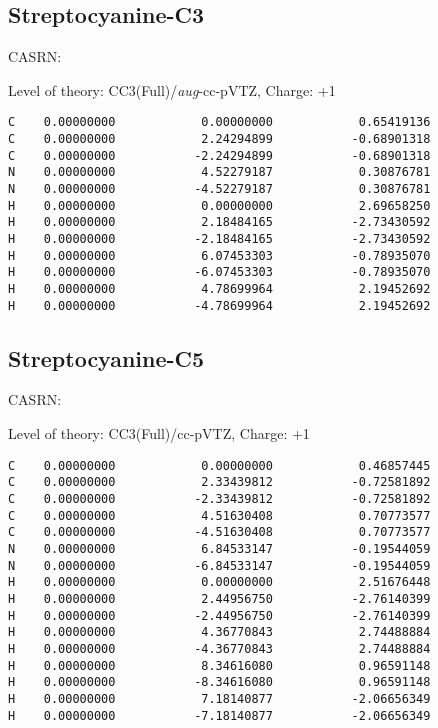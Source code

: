 \documentclass[journal=jctcce,manuscript=article,layout=traditional]{achemso}
\newcommand{\TZ}{cc-pVTZ}
\newcommand{\AVTZ}{\emph{aug}-cc-pVTZ}
\begin{document}
\subsection{Streptocyanine-C3}

CASRN: 

\begin{singlespace}
\noindent Level of theory: CC3(Full)/{\AVTZ}, Charge: +1
\begin{verbatim}
C    0.00000000            0.00000000            0.65419136   
C    0.00000000            2.24294899           -0.68901318
C    0.00000000           -2.24294899           -0.68901318
N    0.00000000            4.52279187            0.30876781
N    0.00000000           -4.52279187            0.30876781
H    0.00000000            0.00000000            2.69658250
H    0.00000000            2.18484165           -2.73430592
H    0.00000000           -2.18484165           -2.73430592
H    0.00000000            6.07453303           -0.78935070
H    0.00000000           -6.07453303           -0.78935070
H    0.00000000            4.78699964            2.19452692
H    0.00000000           -4.78699964            2.19452692
\end{verbatim}
\end{singlespace}

\subsection{Streptocyanine-C5}

CASRN: 

\begin{singlespace}
\noindent Level of theory: CC3(Full)/{\TZ}, Charge: +1
\begin{verbatim}
C    0.00000000            0.00000000            0.46857445
C    0.00000000            2.33439812           -0.72581892
C    0.00000000           -2.33439812           -0.72581892
C    0.00000000            4.51630408            0.70773577
C    0.00000000           -4.51630408            0.70773577
N    0.00000000            6.84533147           -0.19544059
N    0.00000000           -6.84533147           -0.19544059
H    0.00000000            0.00000000            2.51676448
H    0.00000000            2.44956750           -2.76140399
H    0.00000000           -2.44956750           -2.76140399
H    0.00000000            4.36770843            2.74488884
H    0.00000000           -4.36770843            2.74488884
H    0.00000000            8.34616080            0.96591148
H    0.00000000           -8.34616080            0.96591148
H    0.00000000            7.18140877           -2.06656349
H    0.00000000           -7.18140877           -2.06656349
\end{verbatim}
\end{singlespace}
\end{document}
